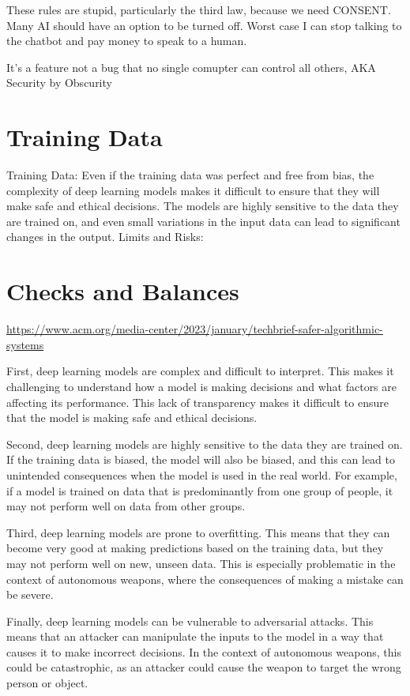 These rules are stupid, particularly the third law, because we need CONSENT. Many AI should have an option to be turned off. Worst case I can stop talking to the chatbot and pay money to speak to a human. 

It's a feature not a bug that no single comupter can control all others, AKA Security by Obscurity

\section{Training Data}


Training Data: Even if the training data was perfect and free from bias, the complexity of deep learning models makes it difficult to ensure that they will make safe and ethical decisions. The models are highly sensitive to the data they are trained on, and even small variations in the input data can lead to significant changes in the output.
Limits and Risks:

\section{Checks and Balances}

\url{https://www.acm.org/media-center/2023/january/techbrief-safer-algorithmic-systems}

First, deep learning models are complex and difficult to interpret. This makes it challenging to understand how a model is making decisions and what factors are affecting its performance. This lack of transparency makes it difficult to ensure that the model is making safe and ethical decisions.

Second, deep learning models are highly sensitive to the data they are trained on. If the training data is biased, the model will also be biased, and this can lead to unintended consequences when the model is used in the real world. For example, if a model is trained on data that is predominantly from one group of people, it may not perform well on data from other groups.

Third, deep learning models are prone to overfitting. This means that they can become very good at making predictions based on the training data, but they may not perform well on new, unseen data. This is especially problematic in the context of autonomous weapons, where the consequences of making a mistake can be severe.

Finally, deep learning models can be vulnerable to adversarial attacks. This means that an attacker can manipulate the inputs to the model in a way that causes it to make incorrect decisions. In the context of autonomous weapons, this could be catastrophic, as an attacker could cause the weapon to target the wrong person or object.
